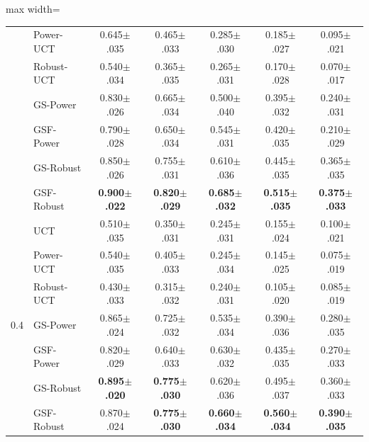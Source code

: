 \begin{table}[t]
\begin{adjustbox}{max width=\linewidth}
\begin{tabular}{llccccc}
 & Power-UCT & 0.645{\scriptsize$\pm$.035} & 0.465{\scriptsize$\pm$.033} & 0.285{\scriptsize$\pm$.030} & 0.185{\scriptsize$\pm$.027} & 0.095{\scriptsize$\pm$.021} \\
 & Robust-UCT & 0.540{\scriptsize$\pm$.034} & 0.365{\scriptsize$\pm$.035} & 0.265{\scriptsize$\pm$.031} & 0.170{\scriptsize$\pm$.028} & 0.070{\scriptsize$\pm$.017} \\
 & GS-Power & 0.830{\scriptsize$\pm$.026} & 0.665{\scriptsize$\pm$.034} & 0.500{\scriptsize$\pm$.040} & 0.395{\scriptsize$\pm$.032} & 0.240{\scriptsize$\pm$.031} \\
 & GSF-Power & 0.790{\scriptsize$\pm$.028} & 0.650{\scriptsize$\pm$.034} & 0.545{\scriptsize$\pm$.031} & 0.420{\scriptsize$\pm$.035} & 0.210{\scriptsize$\pm$.029} \\
 & GS-Robust & 0.850{\scriptsize$\pm$.026} & 0.755{\scriptsize$\pm$.031} & 0.610{\scriptsize$\pm$.036} & 0.445{\scriptsize$\pm$.035} & 0.365{\scriptsize$\pm$.035} \\
 & GSF-Robust & \textbf{0.900{\scriptsize$\pm$.022}} & \textbf{0.820{\scriptsize$\pm$.029}} & \textbf{0.685{\scriptsize$\pm$.032}} & \textbf{0.515{\scriptsize$\pm$.035}} & \textbf{0.375{\scriptsize$\pm$.033}} \\
\midrule 
\multirow{7}{*}{0.4} & UCT & 0.510{\scriptsize$\pm$.035} & 0.350{\scriptsize$\pm$.031} & 0.245{\scriptsize$\pm$.031} & 0.155{\scriptsize$\pm$.024} & 0.100{\scriptsize$\pm$.021} \\
 & Power-UCT & 0.540{\scriptsize$\pm$.035} & 0.405{\scriptsize$\pm$.033} & 0.245{\scriptsize$\pm$.034} & 0.145{\scriptsize$\pm$.025} & 0.075{\scriptsize$\pm$.019} \\
 & Robust-UCT & 0.430{\scriptsize$\pm$.033} & 0.315{\scriptsize$\pm$.032} & 0.240{\scriptsize$\pm$.031} & 0.105{\scriptsize$\pm$.020} & 0.085{\scriptsize$\pm$.019} \\
 & GS-Power & 0.865{\scriptsize$\pm$.024} & 0.725{\scriptsize$\pm$.032} & 0.535{\scriptsize$\pm$.034} & 0.390{\scriptsize$\pm$.036} & 0.280{\scriptsize$\pm$.035} \\
 & GSF-Power & 0.820{\scriptsize$\pm$.029} & 0.640{\scriptsize$\pm$.033} & 0.630{\scriptsize$\pm$.032} & 0.435{\scriptsize$\pm$.035} & 0.270{\scriptsize$\pm$.033} \\
 & GS-Robust & \textbf{0.895{\scriptsize$\pm$.020}} & \textbf{0.775{\scriptsize$\pm$.030}} & 0.620{\scriptsize$\pm$.036} & 0.495{\scriptsize$\pm$.037} & 0.360{\scriptsize$\pm$.033} \\
 & GSF-Robust & 0.870{\scriptsize$\pm$.024} & \textbf{0.775{\scriptsize$\pm$.030}} & \textbf{0.660{\scriptsize$\pm$.034}} & \textbf{0.560{\scriptsize$\pm$.034}} & \textbf{0.390{\scriptsize$\pm$.035}} \\

\end{tabular}
\end{adjustbox}
\end{table}
